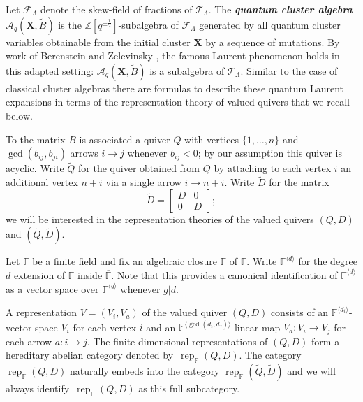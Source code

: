 \documentclass[12pt]{amsart}
\newcommand{\bfX}{\mathbf{X}}
\newcommand{\cA}{\mathcal{A}}
\newcommand{\cF}{\mathcal{F}}
\newcommand{\cT}{\mathcal{T}}
\newcommand{\FF}{\mathbb{F}}
\newcommand{\half}{{\frac{1}{2}}}
\newcommand{\rep}{\operatorname{rep}}
\newcommand{\ZZ}{\mathbb{Z}}
\newcommand{\newword}[1]{\textbf{\emph{#1}}}
\begin{document}
  Let $\cF_\Lambda$ denote the skew-field of fractions of $\cT_\Lambda$.
  The \newword{quantum cluster algebra} $\cA_q(\bfX,\widetilde{B})$ is the $\ZZ[q^{\pm\half}]$-subalgebra of $\cF_\Lambda$ generated by all quantum cluster variables obtainable from the initial cluster $\bfX$ by a sequence of mutations.
  By work of Berenstein and Zelevinsky \cite{berenstein-zelevinsky}, the famous Laurent phenomenon holds in this adapted setting: $\cA_q(\bfX,\widetilde{B})$ is a subalgebra of $\cT_\Lambda$.
  Similar to the case of classical cluster algebras there are formulas to describe these quantum Laurent expansions in terms of the representation theory of valued quivers that we recall below.


  To the matrix $B$ is associated a quiver $Q$ with vertices $\{1,\ldots,n\}$ and $\gcd(b_{ij},b_{ji})$ arrows $i\longrightarrow j$ whenever $b_{ij}<0$; by our assumption this quiver is acyclic.
  Write $\widetilde{Q}$ for the quiver obtained from $Q$ by attaching to each vertex $i$ an additional vertex $n+i$ via a single arrow $i\to n+i$. 
  Write $\widetilde{D}$ for the matrix 
  \[
    \widetilde{D}=\left[\begin{array}{cc}D&0\\0&D\end{array}\right];
  \]
  we will be interested in the representation theories of the valued quivers $(Q,D)$ and  $(\widetilde{Q},\widetilde{D})$.

  Let $\FF$ be a finite field and fix an algebraic closure $\overline{\FF}$ of $\FF$.  
  Write $\FF^{\langle d\rangle}$ for the degree $d$ extension of $\FF$ inside $\overline{\FF}$.
  Note that this provides a canonical identification of $\FF^{\langle d\rangle}$ as a vector space over $\FF^{\langle g\rangle}$ whenever $g|d$.  
  
  A representation $V=(V_i,V_a)$ of the valued quiver $(Q,D)$ consists of an $\FF^{\langle d_i\rangle}$-vector space $V_i$ for each vertex $i$ and an $\FF^{\langle\gcd(d_i,d_j)\rangle}$-linear map $V_a:V_i\to V_j$ for each arrow $a:i\to j$.  
  The finite-dimensional representations of $(Q,D)$ form a hereditary abelian category denoted by~$\rep_\FF(Q,D)$.  
  The category $\rep_\FF(Q,D)$ naturally embeds into the category $\rep_\FF(\widetilde{Q},\widetilde{D})$ and we will always identify~$\rep_\FF(Q,D)$ as this full subcategory.
\end{document}

